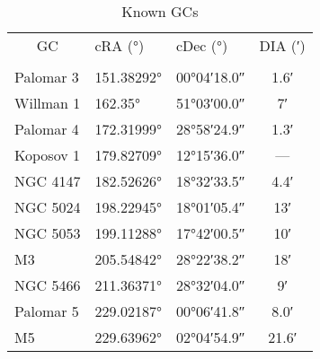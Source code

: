 \begin{table}[H]
    \centering
    \caption{Known GCs}
    \label{tb:known-gcs}
    \begin{tabular}[t]{l l l c}
        \toprule
        \midrule
        \multicolumn{1}{c}{GC} & \ac{c}{RA (\si{\degree})}                 & \ac{c}{Dec (\si{\degree})}                  & DIA (\si{\arcminute}) \\
        \addlinespace[2em]
        \midrule[0.5pt]
        \multicolumn{4}{c}{Area 1}                                                                                                               \\
        \midrule[0.5pt]
        Palomar 3              & \ang[minimum-integer-digits=2]{151.38292} & \ang[minimum-integer-digits=2]{+00;04;18.0} & \ang{;1.6;}           \\
        Willman 1              & \ang[minimum-integer-digits=2]{162.35}    & \ang[minimum-integer-digits=2]{+51;03;00.0} & \ang{;7;}             \\
        Palomar 4              & \ang[minimum-integer-digits=2]{172.31999} & \ang[minimum-integer-digits=2]{+28;58;24.9} & \ang{;1.3;}           \\
        Koposov 1              & \ang[minimum-integer-digits=2]{179.82709} & \ang[minimum-integer-digits=2]{+12;15;36.0} & ---                   \\
        NGC 4147               & \ang[minimum-integer-digits=2]{182.52626} & \ang[minimum-integer-digits=2]{+18;32;33.5} & \ang{;4.4;}           \\
        NGC 5024               & \ang[minimum-integer-digits=2]{198.22945} & \ang[minimum-integer-digits=2]{+18;01;05.4} & \ang{;13;}            \\
        NGC 5053               & \ang[minimum-integer-digits=2]{199.11288} & \ang[minimum-integer-digits=2]{+17;42;00.5} & \ang{;10;}            \\
        M3                     & \ang[minimum-integer-digits=2]{205.54842} & \ang[minimum-integer-digits=2]{+28;22;38.2} & \ang{;18;}            \\
        NGC 5466               & \ang[minimum-integer-digits=2]{211.36371} & \ang[minimum-integer-digits=2]{+28;32;04.0} & \ang{;9;}             \\
        Palomar 5              & \ang[minimum-integer-digits=2]{229.02187} & \ang[minimum-integer-digits=2]{+00;06;41.8} & \ang{;8.0;}           \\
        M5                     & \ang[minimum-integer-digits=2]{229.63962} & \ang[minimum-integer-digits=2]{+02;04;54.9} & \ang{;21.6;}          \\

\end{tabular}
\end{table}
